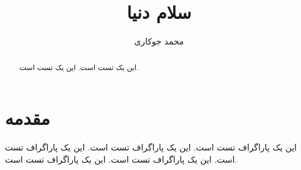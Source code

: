 \documentclass[10pt,twocolumn]{article}
\title{سلام دنیا}
\author{محمد جوکاری \qquad \lr{Mohammed Jowkari}}
\date{}
\begin{document}
\maketitle
\begin{abstract}
این یک تست است. این یک تست است.
\end{abstract}
\section{مقدمه}
این یک پاراگراف تست است. این یک پاراگراف تست است. این یک پاراگراف تست است. این یک پاراگراف تست است. این یک پاراگراف تست است.
\end{document}
